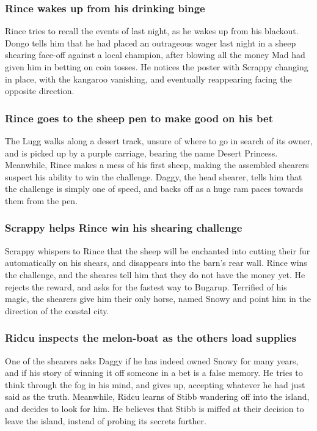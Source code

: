 \subsubsection{\Gls{Rince} wakes up from his drinking binge}
\Gls{Rince} tries to recall the events of last night, as he wakes up from his blackout. \Gls{Dongo}
tells him that he had placed an outrageous wager last night in a sheep shearing face-off against a
local champion, after blowing all the money \Gls{Mad} had given him in betting on coin tosses.
He notices the poster with \Gls{Scrappy} changing in place, with the kangaroo vanishing, and
eventually reappearing facing the opposite direction.

\subsubsection{\Gls{Rince} goes to the sheep pen to make good on his bet}
The \Gls{Lugg} walks along a desert track, unsure of where to go in search of its owner, and is
picked up by a purple carriage, bearing the name Desert Princess. Meanwhile, \Gls{Rince} makes a
mess of his first sheep, making the assembled shearers suspect his ability to win the challenge.
\Gls{Daggy}, the head shearer, tells him that the challenge is simply one of speed, and backs off
as a huge ram paces towards them from the pen.

\subsubsection{\Gls{Scrappy} helps \Gls{Rince} win his shearing challenge}
\Gls{Scrappy} whispers to \Gls{Rince} that the sheep will be enchanted into cutting their fur
automatically on his shears, and disappears into the barn's rear wall. \Gls{Rince} wins the
challenge, and the sheares tell him that they do not have the money yet. He rejects the reward, and
asks for the fastest way to Bugarup. Terrified of his magic, the shearers give him their only horse,
named \Gls{Snowy} and point him in the direction of the coastal city.

\subsubsection{\Gls{Ridcu} inspects the melon-boat as the others load supplies}
One of the shearers asks \Gls{Daggy} if he has indeed owned \Gls{Snowy} for many years, and if his
story of winning it off someone in a bet is a false memory. He tries to think through the fog in
his mind, and gives up, accepting whatever he had just said as the truth. Meanwhile, \Gls{Ridcu}
learns of \Gls{Stibb} wandering off into the island, and decides to look for him. He believes that
\Gls{Stibb} is miffed at their decision to leave the island, instead of probing its secrets further.

